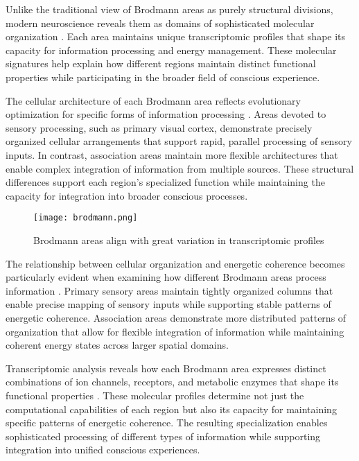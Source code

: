 Unlike the traditional view of Brodmann areas as purely structural divisions, modern neuroscience reveals them as domains of sophisticated molecular organization \cite{Hawrylycz2012}. Each area maintains unique transcriptomic profiles that shape its capacity for information processing and energy management. These molecular signatures help explain how different regions maintain distinct functional properties while participating in the broader field of conscious experience.

The cellular architecture of each Brodmann area reflects evolutionary optimization for specific forms of information processing \cite{Palomero-Gallagher2019}. Areas devoted to sensory processing, such as primary visual cortex, demonstrate precisely organized cellular arrangements that support rapid, parallel processing of sensory inputs. In contrast, association areas maintain more flexible architectures that enable complex integration of information from multiple sources. These structural differences support each region's specialized function while maintaining the capacity for integration into broader conscious processes.

\begin{figure}[h]
    \centering
    \texttt{[image: brodmann.png]}

    \caption{Brodmann areas align with great variation in transcriptomic profiles}
\end{figure}

The relationship between cellular organization and energetic coherence becomes particularly evident when examining how different Brodmann areas process information \cite{Passingham2002}. Primary sensory areas maintain tightly organized columns that enable precise mapping of sensory inputs while supporting stable patterns of energetic coherence. Association areas demonstrate more distributed patterns of organization that allow for flexible integration of information while maintaining coherent energy states across larger spatial domains.

Transcriptomic analysis reveals how each Brodmann area expresses distinct combinations of ion channels, receptors, and metabolic enzymes that shape its functional properties \cite{Lake2018}. These molecular profiles determine not just the computational capabilities of each region but also its capacity for maintaining specific patterns of energetic coherence. The resulting specialization enables sophisticated processing of different types of information while supporting integration into unified conscious experiences.

